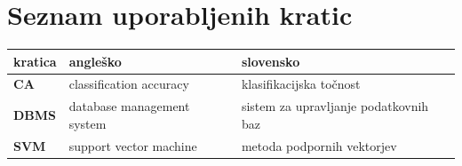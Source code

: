 \documentclass[a4paper, 12pt]{book}
\newcommand{\clearemptydoublepage}{\newpage{\pagestyle{empty}\cleardoublepage}}
\begin{document}
\clearemptydoublepage


\clearemptydoublepage


\pagestyle{empty}
\def\thepage{}%
\tableofcontents{}


\clearemptydoublepage


\chapter*{Seznam uporabljenih kratic}  %

\noindent\begin{tabular}{p{}|p{}|p{}}    %
  {\bf kratica} & {\bf angleško}                             & {\bf slovensko} \\ \hline
  {\bf CA}      & classification accuracy               & klasifikacijska točnost \\
  {\bf DBMS} & database management system & sistem za upravljanje podatkovnih baz \\
  {\bf SVM}   & support vector machine              & metoda podpornih vektorjev \\
\end{tabular}
\end{document}

